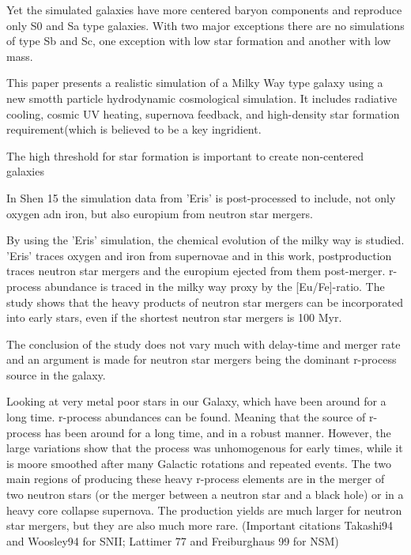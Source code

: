 Yet the simulated galaxies have more centered baryon components and reproduce only S0 and Sa type galaxies. With two major exceptions there are no simulations of type Sb and Sc, one exception with low star formation and another with low mass.

This paper presents a realistic simulation of a Milky Way type galaxy using a new smotth particle hydrodynamic cosmological simulation. It includes radiative cooling, cosmic UV heating, supernova feedback, and high-density star formation requirement(which is believed to be a key ingridient.

The high threshold for star formation is important to create non-centered galaxies

In Shen 15  the simulation data from 'Eris' is post-processed to include, not only oxygen adn iron, but also europium from neutron star mergers.

By using the 'Eris' simulation\cite{guedes11e}, the chemical evolution of the milky way is studied.
'Eris' traces oxygen and iron from supernovae and in this work, postproduction traces neutron star mergers and the europium ejected from them post-merger.
r-process abundance is traced in the milky way proxy by the [Eu/Fe]-ratio.
The study shows that the heavy products of neutron star mergers can be incorporated into early stars, even if the shortest neutron star mergers is 100 Myr.

The conclusion of the study does not vary much with delay-time and merger rate and an argument is made for neutron star mergers being the dominant r-process source in the galaxy.

Looking at very metal poor stars in our Galaxy, which have been around for a long time. r-process abundances can be found. Meaning that the source of r-process has been around for a long time, and in a robust manner. However, the large variations show that the process was unhomogenous for early times, while it is moore smoothed after many Galactic rotations and repeated events.
The two main regions of producing these heavy r-process elements are in the merger of two neutron stars (or the merger between a neutron star and a black hole) or in a heavy core collapse supernova. The production yields are much larger for neutron star mergers, but they are also much more rare.
(Important citations Takashi94 and Woosley94 for SNII; Lattimer 77 and Freiburghaus 99 for NSM)

